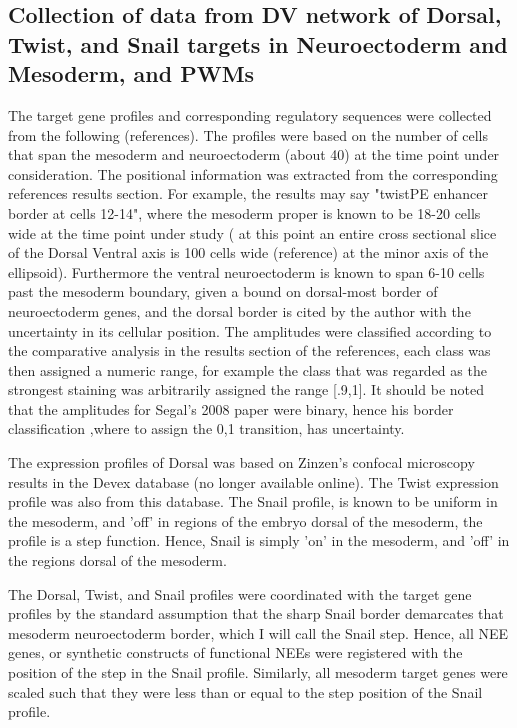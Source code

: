 \subsection{Collection of data from DV network of Dorsal, Twist, and Snail targets in Neuroectoderm and Mesoderm, and PWMs}\label{DVdata}
The target gene profiles and corresponding regulatory sequences were collected from the following (references)\cite{Jiang1993741}\cite{pmid8453668}\cite{pmid1655572}.  The profiles were based on the number of cells that span the mesoderm and neuroectoderm (about 40) at the time point under consideration.  The positional information was extracted from the corresponding references results section.  For example, the results may say "twistPE enhancer border at cells 12-14", where the mesoderm proper is known to be 18-20 cells wide at the time point under study ( at this point an entire cross sectional slice of the Dorsal Ventral axis is 100 cells wide (reference) at the minor axis of the ellipsoid).  Furthermore the ventral neuroectoderm is known to span 6-10 cells past the mesoderm boundary, given a bound on dorsal-most border of neuroectoderm genes, and the dorsal border is cited by the author with the uncertainty in its cellular position.  The amplitudes were classified according to the comparative analysis in the results section of the references, each class was then assigned a numeric range, for example the class that was regarded as the strongest staining was arbitrarily assigned the range [.9,1].  It should be noted that the amplitudes for Segal's 2008 paper were binary, hence his border classification ,where to assign the 0,1 transition, has uncertainty.  

The expression profiles of Dorsal was based on Zinzen's confocal microscopy results in the Devex database (no longer available online).  The Twist expression profile was also from this database.  The Snail profile, is known to be uniform in the mesoderm, and 'off' in regions of the embryo dorsal of the mesoderm, the profile is a step function.  Hence, Snail is simply 'on' in the mesoderm, and 'off' in the regions dorsal of the mesoderm.  

The Dorsal, Twist, and Snail profiles were coordinated with the target gene profiles by the standard assumption that the sharp Snail border demarcates that mesoderm neuroectoderm border, which I will call the Snail step.  Hence, all NEE genes, or synthetic constructs of functional NEEs were registered with the position of the step in the Snail profile.  Similarly, all mesoderm target genes were scaled such that they were less than or equal to the step position of the Snail profile. 


